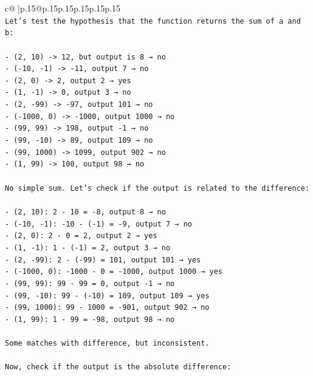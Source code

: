 \documentclass{article}
\begin{document}
{\begin{supertabular}{c@{$\;$}|p{.15\linewidth}@{}p{.15\linewidth}p{.15\linewidth}p{.15\linewidth}p{.15\linewidth}p{.15\linewidth}}
{{{\\ 
\texttt{Let's test the hypothesis that the function returns the sum of a and b:} \\
\\ 
\texttt{{-} (2, 10) {-}> 12, but output is 8 → no} \\
\texttt{{-} ({-}10, {-}1) {-}> {-}11, output 7 → no} \\
\texttt{{-} (2, 0) {-}> 2, output 2 → yes} \\
\texttt{{-} (1, {-}1) {-}> 0, output 3 → no} \\
\texttt{{-} (2, {-}99) {-}> {-}97, output 101 → no} \\
\texttt{{-} ({-}1000, 0) {-}> {-}1000, output 1000 → no} \\
\texttt{{-} (99, 99) {-}> 198, output {-}1 → no} \\
\texttt{{-} (99, {-}10) {-}> 89, output 109 → no} \\
\texttt{{-} (99, 1000) {-}> 1099, output 902 → no} \\
\texttt{{-} (1, 99) {-}> 100, output 98 → no} \\
\\ 
\texttt{No simple sum. Let's check if the output is related to the difference:} \\
\\ 
\texttt{{-} (2, 10): 2 {-} 10 = {-}8, output 8 → no} \\
\texttt{{-} ({-}10, {-}1): {-}10 {-} ({-}1) = {-}9, output 7 → no} \\
\texttt{{-} (2, 0): 2 {-} 0 = 2, output 2 → yes} \\
\texttt{{-} (1, {-}1): 1 {-} ({-}1) = 2, output 3 → no} \\
\texttt{{-} (2, {-}99): 2 {-} ({-}99) = 101, output 101 → yes} \\
\texttt{{-} ({-}1000, 0): {-}1000 {-} 0 = {-}1000, output 1000 → yes} \\
\texttt{{-} (99, 99): 99 {-} 99 = 0, output {-}1 → no} \\
\texttt{{-} (99, {-}10): 99 {-} ({-}10) = 109, output 109 → yes} \\
\texttt{{-} (99, 1000): 99 {-} 1000 = {-}901, output 902 → no} \\
\texttt{{-} (1, 99): 1 {-} 99 = {-}98, output 98 → no} \\
\\ 
\texttt{Some matches with difference, but inconsistent.} \\
\\ 
\texttt{Now, check if the output is the absolute difference:} \\
}}}
\end{supertabular}}
\end{document}
